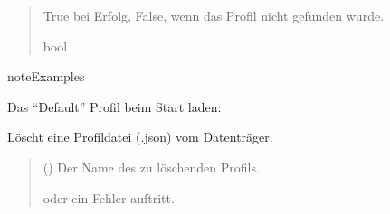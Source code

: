 \documentclass[letterpaper,10pt,english]{sphinxmanual}
\begin{document}
\begin{fulllineitems}
\begin{fulllineitems}
\begin{quote}
\begin{description}
\sphinxAtStartPar
True bei Erfolg, False, wenn das Profil nicht gefunden wurde.

\sphinxAtStartPar
bool

\end{description}\end{quote}

\begin{sphinxadmonition}{note}{Examples}

\sphinxAtStartPar
Das “Default” Profil beim Start laden:

\begin{sphinxVerbatim}[commandchars=\\\{\}]
  
\end{sphinxVerbatim}
\end{sphinxadmonition}

\end{fulllineitems}


\begin{fulllineitems}
\label{\detokenize{modulab/profile_manager:modules.profile.ProfileManager.ProfileManager.delete_profile}}
\pysigstartsignatures
\pysiglinewithargsret
{}
{}
{}
\pysigstopsignatures
\sphinxAtStartPar
Löscht eine Profildatei (.json) vom Datenträger.
\begin{quote}\begin{description}
\sphinxAtStartPar
{} () \textendash{} Der Name des zu löschenden Profils.

\sphinxAtStartPar
\begin{description}
\sphinxAtStartPar
oder ein Fehler auftritt.


\end{description}
\end{description}
\end{quote}
\end{fulllineitems}
\end{fulllineitems}
\end{document}
